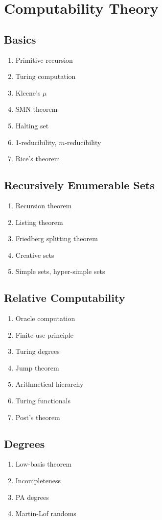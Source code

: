 \documentclass{article}
\begin{document}
\section{Computability Theory}
\subsection{Basics}
\begin{enumerate}
  \item Primitive recursion
  \item Turing computation
  \item Kleene's $\mu$
  \item SMN theorem
  \item Halting set
  \item 1-reducibility, $m$-reducibility
  \item Rice's theorem
\end{enumerate}

\subsection{Recursively Enumerable Sets} 
\begin{enumerate}
  \item Recursion theorem
  \item Listing theorem
  \item Friedberg splitting theorem
  \item Creative sets
  \item Simple sets, hyper-simple sets
\end{enumerate}

\subsection{Relative Computability} 
\begin{enumerate}
  \item Oracle computation
  \item Finite use principle
  \item Turing degrees
  \item Jump theorem
  \item Arithmetical hierarchy
  \item Turing functionals
  \item Post's theorem
\end{enumerate}

\subsection{Degrees} 
\begin{enumerate}
  \item Low-basis theorem
  \item Incompleteness
  \item PA degrees
  \item Martin-Lof randoms
\end{enumerate}
\end{document}
